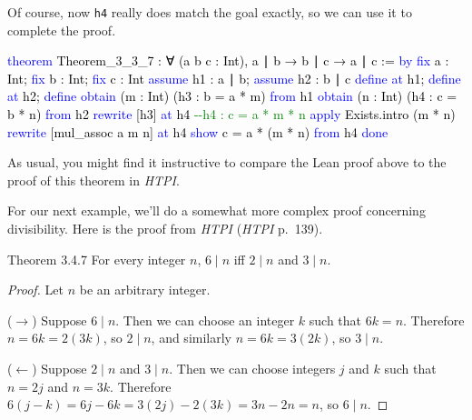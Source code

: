 \documentclass[
  letterpaper,
  DIV=11,
  numbers=noendperiod]{scrreprt}
\newenvironment{Shaded}{\begin{snugshade}}{\end{snugshade}}
\newcommand{\CommentTok}[1]{\textcolor[rgb]{0.37,0.37,0.37}{#1}}
\newcommand{\KeywordTok}[1]{\textcolor[rgb]{0.00,0.23,0.31}{#1}}
\newcommand{\NormalTok}[1]{\textcolor[rgb]{0.00,0.23,0.31}{#1}}
\renewcommand{\NormalTok}[1]{\textcolor[HTML]{000000}{#1}}
\renewcommand{\KeywordTok}[1]{\textcolor[HTML]{0000FF}{#1}}
\renewcommand{\CommentTok}[1]{\textcolor[HTML]{008000}{#1}}
\newcommand{\excl}[1]{}
\theoremstyle{remark}
\begin{document}
Of course, now \texttt{h4} really does match the goal exactly, so we can
use it to complete the proof.

\begin{Shaded}
\begin{Highlighting}[]
\KeywordTok{theorem}\NormalTok{ Theorem\_3\_3\_7 :}
\NormalTok{    ∀ (a b c : Int), a ∣ b → b ∣ c → a ∣ c := }\KeywordTok{by}
  \KeywordTok{fix}\NormalTok{ a : Int; }\KeywordTok{fix}\NormalTok{ b : Int; }\KeywordTok{fix}\NormalTok{ c : Int}
  \KeywordTok{assume}\NormalTok{ h1 : a ∣ b; }\KeywordTok{assume}\NormalTok{ h2 : b ∣ c}
  \KeywordTok{define} \KeywordTok{at}\NormalTok{ h1; }\KeywordTok{define} \KeywordTok{at}\NormalTok{ h2; }\KeywordTok{define}
  \KeywordTok{obtain}\NormalTok{ (m : Int) (h3 : b = a * m) }\KeywordTok{from}\NormalTok{ h1}
  \KeywordTok{obtain}\NormalTok{ (n : Int) (h4 : c = b * n) }\KeywordTok{from}\NormalTok{ h2}
  \KeywordTok{rewrite}\NormalTok{ [h3] }\KeywordTok{at}\NormalTok{ h4   }\CommentTok{{-}{-}h4 : c = a * m * n}
  \KeywordTok{apply}\NormalTok{ Exists.intro (m * n)}
  \KeywordTok{rewrite}\NormalTok{ [mul\_assoc a m n] }\KeywordTok{at}\NormalTok{ h4}
  \KeywordTok{show}\NormalTok{ c = a * (m * n) }\KeywordTok{from}\NormalTok{ h4}
  \KeywordTok{done}
\end{Highlighting}
\end{Shaded}

As usual, you might find it instructive to compare the Lean proof above
to the proof of this theorem in \emph{HTPI}.

For our next example, we'll do a somewhat more complex proof concerning
divisibility. Here is the proof from \emph{HTPI} (\emph{HTPI} p.~139).

\begin{nthm}{Theorem 3.4.7}
For every integer \(n\), \(6 \mid n\) iff \(2 \mid n\) and \(3 \mid n\).

\end{nthm}

\begin{proof}

Let \(n\) be an arbitrary integer.

(\(\to\)) Suppose \(6 \mid n\). Then we can choose an integer \(k\) such
that \(6k=n\). Therefore \(n = 6k = 2(3k)\), so \(2 \mid n\), and
similarly \(n = 6k = 3(2k)\), so \(3 \mid n\).

(\(\leftarrow\)) Suppose \(2 \mid n\) and \(3 \mid n\). Then we can
choose integers \(j\) and \(k\) such that \(n = 2j\) and \(n = 3k\).
Therefore \(6(j-k) = 6j - 6k = 3(2j) - 2(3k) = 3n - 2n = n\), so
\(6 \mid n\). \excl{~□}\qedhere

\end{proof}
\end{document}
